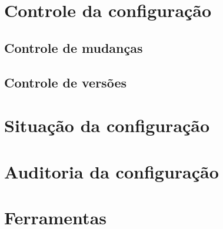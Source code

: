 \section{Controle da configuração}

\subsection{Controle de mudanças}

\subsection{Controle de versões}

\section{Situação da configuração}

\section{Auditoria da configuração}

\section{Ferramentas}